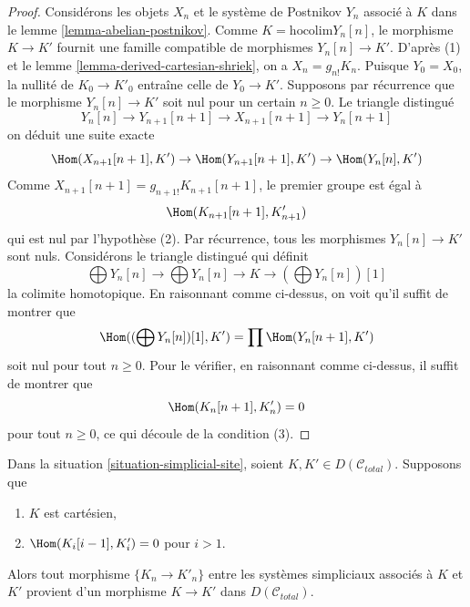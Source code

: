 \begin{proof}
Considérons les objets $X_n$ et le système de Postnikov $Y_n$
associé à $K$ dans le lemme \ref{lemma-abelian-postnikov}.
Comme $K = \text{hocolim} Y_n[n]$, le morphisme $K \to K'$ fournit
une famille compatible de morphismes $Y_n[n] \to K'$.
D'après (1) et le lemme \ref{lemma-derived-cartesian-shriek}, on a
$X_n = g_{n!}K_n$. Puisque $Y_0 = X_0$, la nullité de
$K_0 \to K'_0$ entraîne celle de $Y_0 \to K'$.
Supposons par récurrence que le morphisme $Y_n[n] \to K'$ soit nul
pour un certain $n \geq 0$. Le triangle distingué
$$
Y_n[n] \to Y_{n + 1}[n + 1] \to X_{n + 1}[n + 1] \to Y_n[n + 1]
$$
on déduit une suite exacte
$$
\Hom(X_{n + 1}[n + 1], K') \to
\Hom(Y_{n + 1}[n + 1], K') \to
\Hom(Y_n[n], K')
$$
Comme $X_{n + 1}[n + 1] = g_{n + 1!}K_{n + 1}[n + 1]$, le premier groupe est égal à
$$
\Hom(K_{n + 1}[n + 1], K'_{n + 1})
$$
qui est nul par l'hypothèse (2). Par récurrence, tous les morphismes
$Y_n[n] \to K'$ sont nuls. Considérons le triangle distingué qui définit
$$
\bigoplus Y_n[n] \to
\bigoplus Y_n[n] \to
K \to
(\bigoplus Y_n[n])[1]
$$
la colimite homotopique. En raisonnant comme ci-dessus, on voit qu'il suffit
de montrer que
$$
\Hom((\bigoplus Y_n[n])[1], K') = \prod \Hom(Y_n[n + 1], K')
$$
soit nul pour tout $n \geq 0$. Pour le vérifier, en raisonnant comme ci-dessus,
il suffit de montrer que
$$
\Hom(K_n[n + 1], K'_n)  = 0
$$
pour tout $n \geq 0$, ce qui découle de la condition (3).
\end{proof}

\begin{lemma}
\label{lemma-hom-cartesian-objects-derived}
Dans la situation \ref{situation-simplicial-site},
soient $K, K' \in D(\mathcal{C}_{total})$.
Supposons que
\begin{enumerate}
\item $K$ est cartésien,
\item $\Hom(K_i[i - 1], K'_i) = 0$ pour $i > 1$.
\end{enumerate}
Alors tout morphisme $\{K_n \to K'_n\}$ entre les systèmes simpliciaux associés
à $K$ et $K'$ provient d'un morphisme $K \to K'$ dans $D(\mathcal{C}_{total})$.
\end{lemma}

